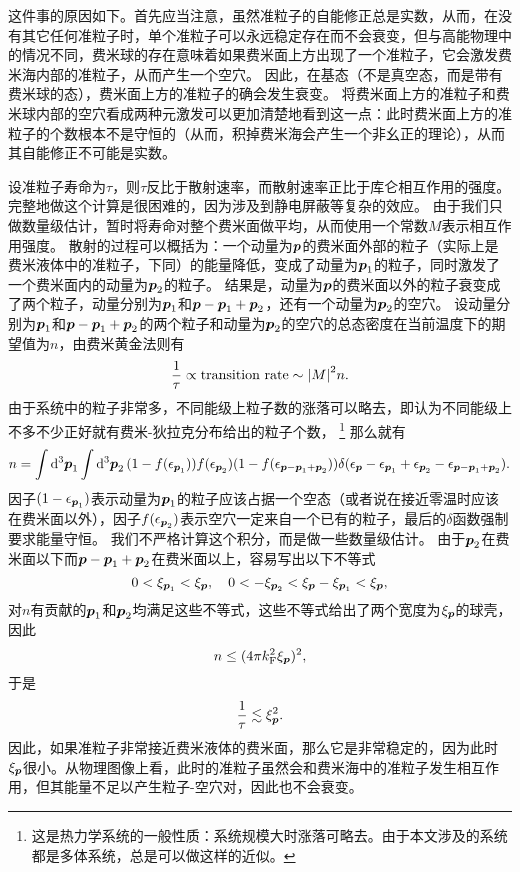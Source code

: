 \documentclass[hyperref, UTF8, a4paper]{ctexart}
\begin{document}
这件事的原因如下。首先应当注意，虽然准粒子的自能修正总是实数，从而，在没有其它任何准粒子时，单个准粒子可以永远稳定存在而不会衰变，但与高能物理中的情况不同，费米球的存在意味着如果费米面上方出现了一个准粒子，它会激发费米海内部的准粒子，从而产生一个空穴。
因此，在基态（不是真空态，而是带有费米球的态），费米面上方的准粒子的确会发生衰变。
将费米面上方的准粒子和费米球内部的空穴看成两种元激发可以更加清楚地看到这一点：此时费米面上方的准粒子的个数根本不是守恒的（从而，积掉费米海会产生一个非幺正的理论），从而其自能修正不可能是实数。

设准粒子寿命为$\tau$，则$\tau$反比于散射速率，而散射速率正比于库仑相互作用的强度。完整地做这个计算是很困难的，因为涉及到静电屏蔽等复杂的效应。
由于我们只做数量级估计，暂时将寿命对整个费米面做平均，从而使用一个常数$M$表示相互作用强度。
散射的过程可以概括为：一个动量为$\vb*{p}$的费米面外部的粒子（实际上是费米液体中的准粒子，下同）的能量降低，变成了动量为$\vb*{p}_1$的粒子，同时激发了一个费米面内的动量为$\vb*{p}_2$的粒子。
结果是，动量为$\vb*{p}$的费米面以外的粒子衰变成了两个粒子，动量分别为$\vb*{p}_1$和$\vb*{p} - \vb*{p}_1 + \vb*{p}_2$，还有一个动量为$\vb*{p}_2$的空穴。
设动量分别为$\vb*{p}_1$和$\vb*{p} - \vb*{p}_1 + \vb*{p}_2$的两个粒子和动量为$\vb*{p}_2$的空穴的总态密度在当前温度下的期望值为$n$，由费米黄金法则有
\[
    \frac{1}{\tau} \propto \text{transition rate} \sim \abs{M}^2 n.
\]
由于系统中的粒子非常多，不同能级上粒子数的涨落可以略去，即认为不同能级上不多不少正好就有费米-狄拉克分布给出的粒子个数，%
\footnote{这是热力学系统的一般性质：系统规模大时涨落可略去。由于本文涉及的系统都是多体系统，总是可以做这样的近似。}%
那么就有
\[
    n = \int \dd[3]{\vb*{p}_1} \int \dd[3]{\vb*{p}_2} (1 - f(\epsilon_{\vb*{p}_1})) f(\epsilon_{\vb*{p}_2}) (1 - f(\epsilon_{\vb*{p} - \vb*{p}_1 + \vb*{p}_2})) \delta(\epsilon_{\vb*{p}} - \epsilon_{\vb*{p}_1} + \epsilon_{\vb*{p}_2} - \epsilon_{\vb*{p} - \vb*{p}_1 + \vb*{p}_2}).
\]
因子$(1-\epsilon_{\vb*{p}_1})$表示动量为$\vb*{p}_1$的粒子应该占据一个空态（或者说在接近零温时应该在费米面以外），因子$f(\epsilon_{\vb*{p}_2})$表示空穴一定来自一个已有的粒子，最后的$\delta$函数强制要求能量守恒。
我们不严格计算这个积分，而是做一些数量级估计。
由于$\vb*{p}_2$在费米面以下而$\vb*{p}- \vb*{p}_1 + \vb*{p}_2$在费米面以上，容易写出以下不等式
\[
    0 < \xi_{\vb*{p}_1} < \xi_{\vb*{p}}, \quad 0 < - \xi_{\vb*{p}_2} < \xi_{\vb*{p}} - \xi_{\vb*{p}_1} < \xi_{\vb*{p}},
\]
对$n$有贡献的$\vb*{p}_1$和$\vb*{p}_2$均满足这些不等式，这些不等式给出了两个宽度为$\xi_{\vb*{p}}$的球壳，因此
\[
    n \leq (4 \pi k_\text{F}^2 \xi_{\vb*{p}})^2,
\]
于是
\begin{equation}
    \frac{1}{\tau} \lesssim \xi_{\vb*{p}}^2.
\end{equation}
因此，如果准粒子非常接近费米液体的费米面，那么它是非常稳定的，因为此时$\xi_{\vb*{p}}$很小。从物理图像上看，此时的准粒子虽然会和费米海中的准粒子发生相互作用，但其能量不足以产生粒子-空穴对，因此也不会衰变。
\end{document}
